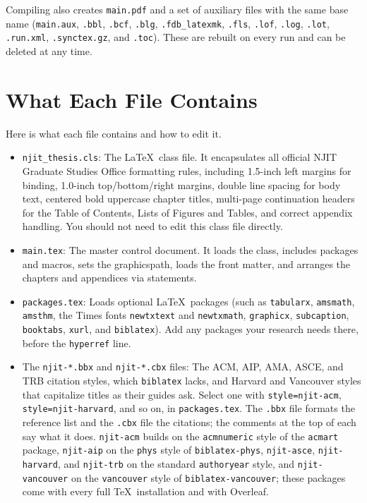 Compiling also creates \texttt{main.pdf} and a set of auxiliary files with the same base name (\texttt{main.aux}, \texttt{.bbl}, \texttt{.bcf}, \texttt{.blg}, \texttt{.fdb\_latexmk}, \texttt{.fls}, \texttt{.lof}, \texttt{.log}, \texttt{.lot}, \texttt{.run.xml}, \texttt{.synctex.gz}, and \texttt{.toc}). These are rebuilt on every run and can be deleted at any time.

\section{What Each File Contains}
\label{sec:filedescriptions}

Here is what each file contains and how to edit it.

\begin{itemize}
\emergencystretch=2.5em
  \item \texttt{njit\_thesis.cls}: The \LaTeX\ class file. It encapsulates all official NJIT Graduate Studies Office formatting rules, including 1.5-inch left margins for binding, 1.0-inch top/bottom/right margins, double line spacing for body text, centered bold uppercase chapter titles, multi-page continuation headers for the Table of Contents, Lists of Figures and Tables, and correct appendix handling. You should not need to edit this class file directly.

  \item \texttt{main.tex}: The master control document. It loads the class, includes packages and macros, sets the graphicspath, loads the front matter, and arranges the chapters and appendices via \verb++ statements.

  \item \texttt{packages.tex}: Loads optional \LaTeX\ packages (such as \texttt{tabularx}, \texttt{amsmath}, \texttt{amsthm}, the Times fonts \texttt{newtxtext} and \texttt{newtxmath}, \texttt{graphicx}, \texttt{subcaption}, \texttt{booktabs}, \texttt{xurl}, and \texttt{biblatex}). Add any packages your research needs there, before the \texttt{hyperref} line.

  \item The \texttt{njit-*.bbx} and \texttt{njit-*.cbx} files: The ACM, AIP, AMA, ASCE, and TRB citation styles, which \texttt{biblatex} lacks, and Harvard and Vancouver styles that capitalize titles as their guides ask. Select one with \texttt{style=njit-acm}, \texttt{style=njit-harvard}, and so on, in \texttt{packages.tex}. The \texttt{.bbx} file formats the reference list and the \texttt{.cbx} file the citations; the comments at the top of each say what it does. \texttt{njit-acm} builds on the \texttt{acmnumeric} style of the \texttt{acmart} package, \texttt{njit-aip} on the \texttt{phys} style of \texttt{biblatex-phys}, \texttt{njit-asce}, \texttt{njit-harvard}, and \texttt{njit-trb} on the standard \texttt{authoryear} style, and \texttt{njit-vancouver} on the \texttt{vancouver} style of \texttt{biblatex-vancouver}; these packages come with every full \TeX\ installation and with Overleaf.


\end{itemize}
